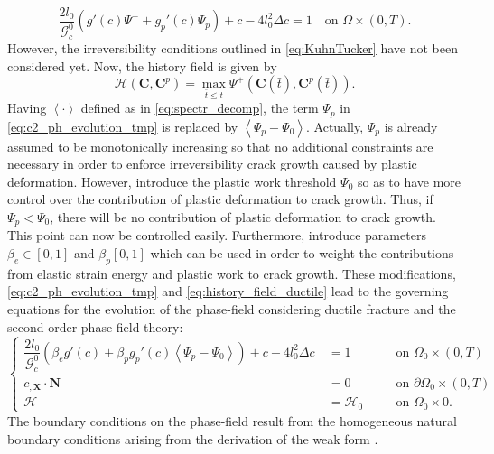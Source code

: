 \begin{equation} \label{eq:c2_ph_evolution_tmp}
\dfrac{2l_{0}}{\mathcal{G}_{c}^{0}}\left(g'\left(c\right)\Psi^{+}+g_{p}'\left(c\right)\Psi_{p}\right) + c - 4l_{0}^{2}\Delta c = 1 \quad\text{on } \Omega\times\left(0,T\right).
\end{equation}
However, the irreversibility conditions outlined in \eqref{eq:KuhnTucker} have not been considered yet. Now, the history field is given by
\begin{equation} \label{eq:history_field_ductile}
	\mathcal{H}\left(\mathbf{C},\mathbf{C}^{p}\right) = \max\limits_{\bar{t}\leq t} \Psi^{+}\left(\mathbf{C}\left(\bar{t}\right),\mathbf{C}^{p}\left(\bar{t}\right)\right).
\end{equation}
Having $\left<\cdot\right>$ defined as in \eqref{eq:spectr_decomp}, the term $\Psi_{p}$ in \eqref{eq:c2_ph_evolution_tmp} is replaced by $\left<\Psi_{p}-\Psi_{0}\right>$. Actually, $\Psi_{p}$ is already assumed to be monotonically increasing so that no additional constraints are necessary in order to enforce irreversibility crack growth caused by plastic deformation. However, \citet{03_PF_ductile} introduce the plastic work threshold $\Psi_{0}$ so as to have more control over the contribution of plastic deformation to crack growth. Thus, if $\Psi_{p}<\Psi_{0}$, there will be no contribution of plastic deformation to crack growth. This point can now be controlled easily. Furthermore, \citet{03_PF_ductile} introduce parameters $\beta_{e}\in\left[0,1\right]$ and $\beta_{p}\left[0,1\right]$ which can be used in order to weight the contributions from elastic strain energy and plastic work to crack growth. These modifications, \eqref{eq:c2_ph_evolution_tmp} and \eqref{eq:history_field_ductile} lead to the governing equations for the evolution of the phase-field considering ductile fracture and the second-order phase-field theory:
\begin{equation} \label{eq:c2_equil_ductile}
	\left\{\begin{alignedat}{2}
		\dfrac{2l_{0}}{\mathcal{G}_{c}^{0}}\left(\beta_{e}g'\left(c\right)+\beta_{p}g_{p}'\left(c\right)\left<\Psi_{p}-\Psi_{0}\right>\right) + c - 4l_{0}^{2}\Delta c\ &= 1 && \quad\text{on } \Omega_{0}\times\left(0,T\right) \\
		c_{,\mathbf{X}}\cdot\mathbf{N} &= 0 && \quad \text{on } \partial\Omega_{0}\times\left(0,T\right) \\
		\mathcal{H} &= \mathcal{H}_{0} && \quad \text{on } \Omega_{0}\times0.
	\end{alignedat}\right.
\end{equation}
The boundary conditions on the phase-field result from the homogeneous natural boundary conditions arising from the derivation of the weak form \citep{11_PF_DissBorden}.

